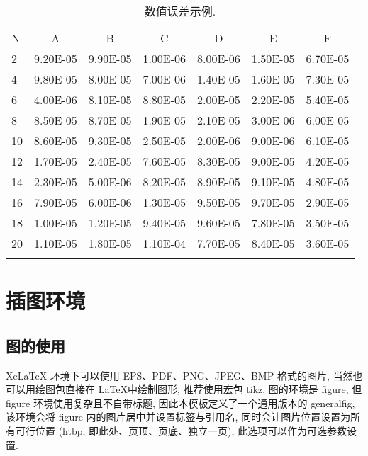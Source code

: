 \documentclass{shnuthesis}
\begin{document}
\begin{table}[htp!]
\centering
\renewcommand\arraystretch{1.2} %
\caption{数值误差示例.}
\label{table2}
\begin{tabularx}{0.9\textwidth}{||P{1cm}|C|C|C|C|C|C||}
\Xhline{2\arrayrulewidth}
N  & A       & B    & C       & D      & E       & F   \\
\Xhline{2\arrayrulewidth}
2  & 9.20E-05 & 9.90E-05 & 1.00E-06 & 8.00E-06 & 1.50E-05 & 6.70E-05 \\
4  & 9.80E-05 & 8.00E-05 & 7.00E-06 & 1.40E-05 & 1.60E-05 & 7.30E-05 \\
6  & 4.00E-06 & 8.10E-05 & 8.80E-05 & 2.00E-05 & 2.20E-05 & 5.40E-05 \\
8  & 8.50E-05 & 8.70E-05 & 1.90E-05 & 2.10E-05 & 3.00E-06 & 6.00E-05 \\
10 & 8.60E-05 & 9.30E-05 & 2.50E-05 & 2.00E-06 & 9.00E-06 & 6.10E-05 \\
12 & 1.70E-05 & 2.40E-05 & 7.60E-05 & 8.30E-05 & 9.00E-05 & 4.20E-05 \\
14 & 2.30E-05 & 5.00E-06 & 8.20E-05 & 8.90E-05 & 9.10E-05 & 4.80E-05 \\
16 & 7.90E-05 & 6.00E-06 & 1.30E-05 & 9.50E-05 & 9.70E-05 & 2.90E-05 \\
18 & 1.00E-05 & 1.20E-05 & 9.40E-05 & 9.60E-05 & 7.80E-05 & 3.50E-05 \\
20 & 1.10E-05 & 1.80E-05 & 1.10E-04   & 7.70E-05 & 8.40E-05 & 3.60E-05  \\
\Xhline{2\arrayrulewidth}
\end{tabularx}
\end{table}

	

\chapter{插图环境}

\section{图的使用}

XeLaTeX 环境下可以使用 EPS、PDF、PNG、JPEG、BMP 格式的图片, 当然也可以用绘图包直接在 \LaTeX 中绘制图形, 推荐使用宏包 tikz. 图的环境是 figure, 但 figure 环境使用复杂且不自带标题, 因此本模板定义了一个通用版本的 generalfig, 该环境会将 figure 内的图片居中并设置标签与引用名, 同时会让图片位置设置为所有可行位置 (htbp, 即此处、页顶、页底、独立一页), 此选项可以作为可选参数设置.
\end{document}
